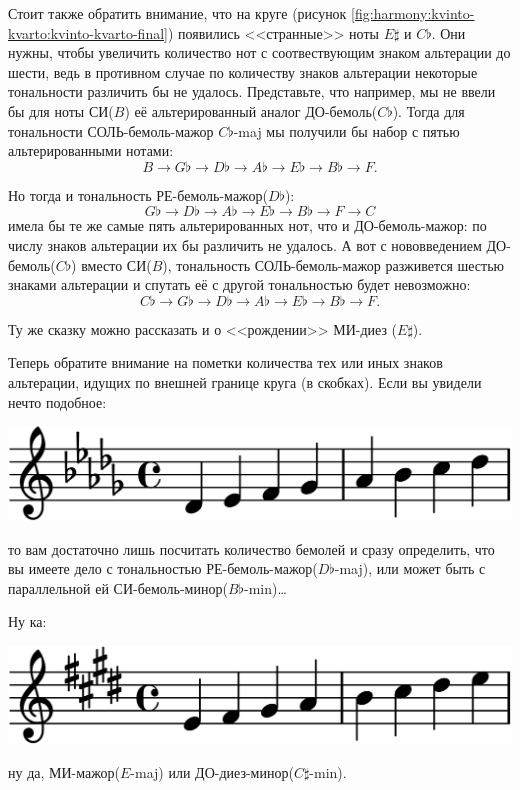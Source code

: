 Стоит также обратить внимание, что на круге (рисунок \ref{fig:harmony:kvinto-kvarto:kvinto-kvarto-final}) появились <<странные>> ноты $E\sharp$ и $C\flat$. Они нужны, чтобы увеличить количество нот с соотвествующим знаком альтерации до шести, ведь в противном случае по количеству знаков альтерации некоторые тональности различить бы не удалось. Представьте, что например, мы не ввели бы для ноты СИ($B$) её альтерированный аналог ДО-бемоль($C\flat$). Тогда для тональности СОЛЬ-бемоль-мажор $C\flat$-maj мы получили бы набор с пятью альтерированными нотами:
\[
    B\rightarrow
    {G\flat}\rightarrow
    {D\flat}\rightarrow
    {A\flat}\rightarrow
    {E\flat}\rightarrow
    {B\flat}\rightarrow
    F.
\]

Но тогда и тональность РЕ-бемоль-мажор($D\flat$):
\[
    {G\flat}\rightarrow
    {D\flat}\rightarrow
    {A\flat}\rightarrow
    {E\flat}\rightarrow
    {B\flat}\rightarrow
    F\rightarrow
    C
\]
имела бы те же самые пять альтерированных нот, что и ДО-бемоль-мажор: по числу знаков альтерации их бы различить не удалось. А вот с нововведением ДО-бемоль($C\flat$) вместо СИ($B$), тональность СОЛЬ-бемоль-мажор разживется шестью знаками альтерации и спутать её с другой тональностью будет невозможно:
\[
    {C\flat}\rightarrow
    {G\flat}\rightarrow
    {D\flat}\rightarrow
    {A\flat}\rightarrow
    {E\flat}\rightarrow
    {B\flat}\rightarrow
    F.
\]

Ту же сказку можно рассказать и о <<рождении>> МИ-диез ($E\sharp$).

Теперь обратите внимание на пометки количества тех или иных знаков альтерации, идущих по внешней границе круга (в скобках). Если вы увидели нечто подобное:

\begin{center}    
    \includegraphics{fig/kvinto-kvarto/tonality-des-maj}
\end{center}

то вам достаточно лишь посчитать количество бемолей и сразу определить, что вы имеете дело с тональностью РЕ-бемоль-мажор($D\flat$-maj), или может быть с параллельной ей СИ-бемоль-минор($B\flat$-min)\ldots

Ну ка:
\begin{center}    
    \includegraphics{fig/kvinto-kvarto/tonality-e-maj}
\end{center}
ну да, МИ-мажор($E$-maj) или ДО-диез-минор($C\sharp$-min).

